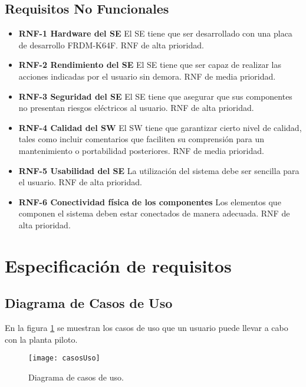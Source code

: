 \subsection{Requisitos No Funcionales}
\begin{itemize}
  	\item \textbf{RNF-1 Hardware del SE} El SE tiene que ser desarrollado con una placa de desarrollo FRDM-K64F. RNF de alta prioridad.
  	\item \textbf{RNF-2 Rendimiento del SE} El SE tiene que ser capaz de realizar las acciones indicadas por el usuario sin demora. RNF de media prioridad.
  	\item \textbf{RNF-3 Seguridad del SE} El SE tiene que asegurar que sus componentes no presentan riesgos eléctricos al usuario. RNF de alta prioridad. 
  	\item \textbf{RNF-4 Calidad del SW} El SW tiene que garantizar cierto nivel de calidad, tales como incluir comentarios que faciliten su comprensión para un mantenimiento o portabilidad posteriores. RNF de media prioridad.
  	\item \textbf{RNF-5 Usabilidad del SE} La utilización del sistema debe ser sencilla para el usuario. RNF de alta prioridad.
  	\item \textbf{RNF-6 Conectividad física de los componentes} Los elementos que componen el sistema deben estar conectados de manera adecuada. RNF de alta prioridad.
\end{itemize}



\section{Especificación de requisitos}

\subsection{Diagrama de Casos de Uso}

En la figura \ref{casosDeUso} se muestran los casos de uso que un usuario puede llevar a cabo con la planta piloto.

\begin{figure}[H]%
    \begin{center}%
    \texttt{[image: casosUso]}%
    \caption{Diagrama de casos de uso.}%
    \label{casosDeUso}%
    \end{center}%
  \end{figure}%

